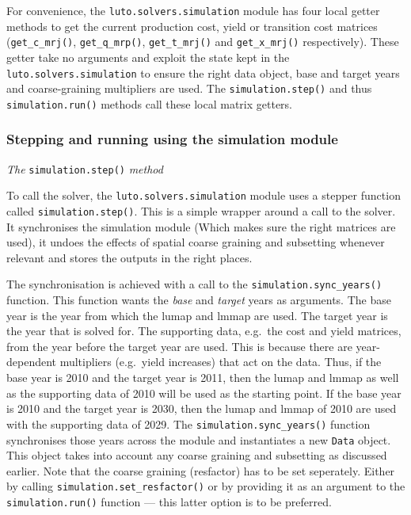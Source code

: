 \documentclass[12pt,a4paper,twoside]{article}
\begin{document}
For convenience, the \texttt{luto.solvers.simulation} module has four local getter methods to get the current production cost, yield or transition cost matrices (\texttt{get_c_mrj()}, \texttt{get_q_mrp()}, \texttt{get_t_mrj()} and \texttt{get_x_mrj()} respectively). These getter take no arguments and exploit the state kept in the \texttt{luto.solvers.simulation} to ensure the right data object, base and target years and coarse-graining multipliers are used. The \texttt{simulation.step()} and thus \texttt{simulation.run()} methods call these local matrix getters.

\subsubsection{Stepping and running using the simulation module}\label{subsubsec:steprun}

\emph{The} \texttt{simulation.step()} \emph{method}

To call the solver, the \texttt{luto.solvers.simulation} module uses a stepper function called \texttt{simulation.step()}. This is a simple wrapper around a call to the solver. It synchronises the simulation module (Which makes sure the right matrices are used), it undoes the effects of spatial coarse graining and subsetting whenever relevant and stores the outputs in the right places.

The synchronisation is achieved with a call to the \texttt{simulation.sync_years()} function. This function wants the \emph{base} and \emph{target} years as arguments. The base year is the year from which the lumap and lmmap are used. The target year is the year that is solved for. The supporting data, e.g.\ the cost and yield matrices, from the year before the target year are used. This is because there are year-dependent multipliers (e.g.\ yield increases) that act on the data. Thus, if the base year is 2010 and the target year is 2011, then the lumap and lmmap as well as the supporting data of 2010 will be used as the starting point. If the base year is 2010 and the target year is 2030, then the lumap and lmmap of 2010 are used with the supporting data of 2029. The \texttt{simulation.sync_years()} function synchronises those years across the module and instantiates a new \texttt{Data} object. This object takes into account any coarse graining and subsetting as discussed earlier. Note that the coarse graining (resfactor) has to be set seperately. Either by calling \texttt{simulation.set_resfactor()} or by providing it as an argument to the \texttt{simulation.run()} function --- this latter option is to be preferred.
\end{document}

